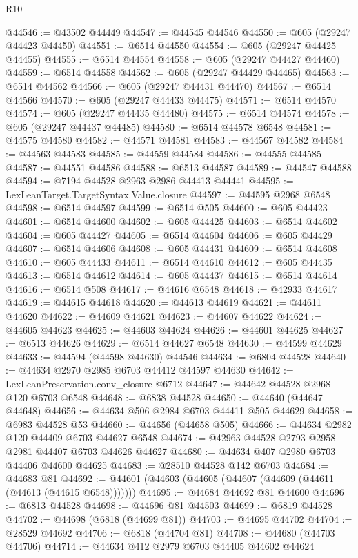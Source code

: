 \begin{lexlean}{R10}
\begin{coremodule}
@44546 := @43502 @44449
@44547 := @44545 @44546
@44550 := @605 (@29247 @44423 @44450)
@44551 := @6514 @44550
@44554 := @605 (@29247 @44425 @44455)
@44555 := @6514 @44554
@44558 := @605 (@29247 @44427 @44460)
@44559 := @6514 @44558
@44562 := @605 (@29247 @44429 @44465)
@44563 := @6514 @44562
@44566 := @605 (@29247 @44431 @44470)
@44567 := @6514 @44566
@44570 := @605 (@29247 @44433 @44475)
@44571 := @6514 @44570
@44574 := @605 (@29247 @44435 @44480)
@44575 := @6514 @44574
@44578 := @605 (@29247 @44437 @44485)
@44580 := @6514 @44578 @6548
@44581 := @44575 @44580
@44582 := @44571 @44581
@44583 := @44567 @44582
@44584 := @44563 @44583
@44585 := @44559 @44584
@44586 := @44555 @44585
@44587 := @44551 @44586
@44588 := @6513 @44587
@44589 := @44547 @44588
@44594 := @7194 @44528 @2963 @2986 @44413 @44441
@44595 := LexLeanTarget.TargetSyntax.Value.closure
@44597 := @44595 @2968 @6548
@44598 := @6514 @44597
@44599 := @6514 @505
@44600 := @605 @44423
@44601 := @6514 @44600
@44602 := @605 @44425
@44603 := @6514 @44602
@44604 := @605 @44427
@44605 := @6514 @44604
@44606 := @605 @44429
@44607 := @6514 @44606
@44608 := @605 @44431
@44609 := @6514 @44608
@44610 := @605 @44433
@44611 := @6514 @44610
@44612 := @605 @44435
@44613 := @6514 @44612
@44614 := @605 @44437
@44615 := @6514 @44614
@44616 := @6514 @508
@44617 := @44616 @6548
@44618 := @42933 @44617
@44619 := @44615 @44618
@44620 := @44613 @44619
@44621 := @44611 @44620
@44622 := @44609 @44621
@44623 := @44607 @44622
@44624 := @44605 @44623
@44625 := @44603 @44624
@44626 := @44601 @44625
@44627 := @6513 @44626
@44629 := @6514 @44627 @6548
@44630 := @44599 @44629
@44633 := @44594 (@44598 @44630) @44546
@44634 := @6804 @44528
@44640 := @44634 @2970 @2985 @6703 @44412 @44597 @44630
@44642 := LexLeanPreservation.conv_closure @6712
@44647 := @44642 @44528 @2968 @120 @6703 @6548
@44648 := @6838 @44528
@44650 := @44640 (@44647 @44648)
@44656 := @44634 @506 @2984 @6703 @44411 @505 @44629
@44658 := @6983 @44528 @53
@44660 := @44656 (@44658 @505)
@44666 := @44634 @2982 @120 @44409 @6703 @44627 @6548
@44674 := @42963 @44528 @2793 @2958 @2981 @44407 @6703 @44626 @44627
@44680 := @44634 @407 @2980 @6703 @44406 @44600 @44625
@44683 := @28510 @44528 @142 @6703
@44684 := @44683 @81
@44692 := @44601 (@44603 (@44605 (@44607 (@44609 (@44611 (@44613 (@44615 @6548)))))))
@44695 := @44684 @44692 @81 @44600
@44696 := @6813 @44528
@44698 := @44696 @81 @44503
@44699 := @6819 @44528
@44702 := @44698 (@6818 (@44699 @81))
@44703 := @44695 @44702
@44704 := @28529 @44692
@44706 := @6818 (@44704 @81)
@44708 := @44680 (@44703 @44706)
@44714 := @44634 @412 @2979 @6703 @44405 @44602 @44624

\end{coremodule}
\end{lexlean}

